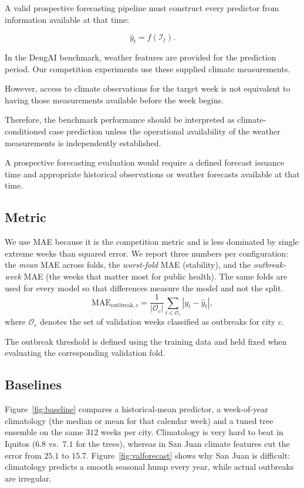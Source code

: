 \documentclass[11pt,a4paper]{article}
\begin{document}
A valid prospective forecasting pipeline
must construct every predictor from
information available at that time:

\begin{equation}
\hat{y}_t = f(\mathcal{I}_t).
\end{equation}

In the DengAI benchmark, weather features
are provided for the prediction period.
Our competition experiments use these
supplied climate measurements.

However, access to climate observations
for the target week is not equivalent to
having those measurements available before
the week begins.

Therefore, the benchmark performance
should be interpreted as climate-conditioned
case prediction unless the operational
availability of the weather measurements
is independently established.

A prospective forecasting evaluation would
require a defined forecast issuance time and
appropriate historical observations or
weather forecasts available at that time.

\subsection{Metric}
We use MAE because it is the competition metric and is less dominated by single extreme weeks than squared error. We report three numbers per configuration: the \emph{mean} MAE across folds, the \emph{worst-fold} MAE (stability), and the \emph{outbreak-week} MAE (the weeks that matter most for public health). The same folds are used for every model so that differences measure the model and not the split.
\begin{equation}
\mathrm{MAE}_{\mathrm{outbreak},c}
=
\frac{1}{|\mathcal{O}_c|}
\sum_{t\in\mathcal{O}_c}
|y_t-\hat{y}_t|,
\end{equation}
where $\mathcal{O}_c$ denotes the set of
validation weeks classified as outbreaks
for city $c$.

The outbreak threshold is defined using
the training data and held fixed when
evaluating the corresponding validation fold.
\subsection{Baselines}
Figure~\ref{fig:baseline} compares a historical-mean predictor, a week-of-year climatology (the median or mean for that calendar week) and a tuned tree ensemble on the same $312$ weeks per city. Climatology is very hard to beat in Iquitos ($6.8$ vs.\ $7.1$ for the trees), whereas in San Juan climate features cut the error from $25.1$ to $15.7$. Figure~\ref{fig:valforecast} shows why San Juan is difficult: climatology predicts a smooth seasonal hump every year, while actual outbreaks are irregular.
\end{document}
